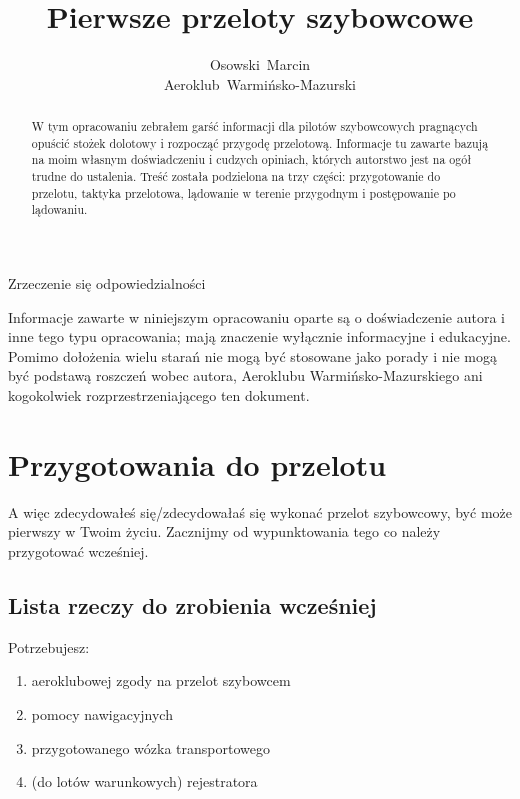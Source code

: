 \documentclass{article}
\title{Pierwsze przeloty szybowcowe}
\author{Osowski~Marcin\\Aeroklub~Warmińsko-Mazurski}
\begin{document}
\maketitle
\newpage

\begin{abstract}
W tym opracowaniu zebrałem garść informacji dla pilotów szybowcowych
pragnących opuścić stożek dolotowy i rozpocząć
przygodę przelotową. Informacje tu zawarte bazują na moim
własnym doświadczeniu i cudzych opiniach, których autorstwo jest na ogół
trudne do ustalenia. Treść została podzielona na trzy części:
przygotowanie do przelotu, taktyka przelotowa, 
lądowanie w terenie przygodnym i postępowanie po lądowaniu.
\end{abstract}
\newpage

\begin{center}\begin{huge}
Zrzeczenie się odpowiedzialności
\end{huge}\end{center}
Informacje zawarte w niniejszym opracowaniu oparte są o doświadczenie
autora i inne tego typu opracowania; mają znaczenie wyłącznie informacyjne
i edukacyjne. Pomimo dołożenia wielu starań nie mogą być stosowane
jako porady i nie mogą być podstawą roszczeń wobec autora,
Aeroklubu Warmińsko-Mazurskiego ani kogokolwiek rozprzestrzeniającego
ten dokument.
\newpage

\tableofcontents
\newpage

\section{Przygotowania do przelotu}
A więc zdecydowałeś się/zdecydowałaś się wykonać przelot szybowcowy, być może
pierwszy w Twoim życiu. Zacznijmy od wypunktowania tego co należy
przygotować wcześniej.

\subsection{Lista rzeczy do zrobienia wcześniej}
Potrzebujesz:
\begin{enumerate}
\item aeroklubowej zgody na przelot szybowcem
\item pomocy nawigacyjnych
\item przygotowanego wózka transportowego
\item (do lotów warunkowych) rejestratora
\end{enumerate}
\end{document}

